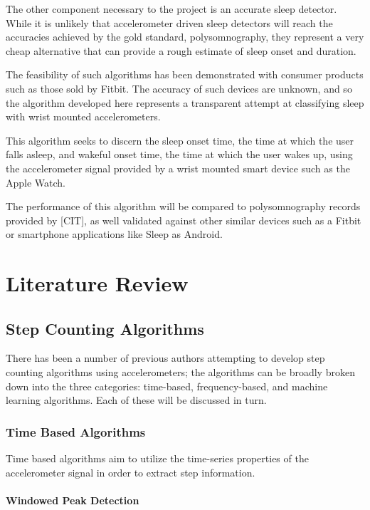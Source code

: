             The other component necessary to the project is an accurate sleep detector. While it is unlikely that accelerometer driven sleep detectors will reach the accuracies achieved by the gold standard, polysomnography, they represent a very cheap alternative that can provide a rough estimate of sleep onset and duration.

            The feasibility of such algorithms has been demonstrated with consumer products such as those sold by Fitbit. The accuracy of such devices are unknown, and so the algorithm developed here represents a transparent attempt at classifying sleep with wrist mounted accelerometers.

            This algorithm seeks to discern the sleep onset time, the time at which the user falls asleep, and wakeful onset time, the time at which the user wakes up, using the accelerometer signal provided by a wrist mounted smart device such as the Apple Watch. 

            The performance of this algorithm will be compared to polysomnography records provided by [CIT], as well validated against other similar devices such as a Fitbit or smartphone applications like Sleep as Android.


    \chapter{Literature Review}

        \section{Step Counting Algorithms}

            There has been a number of previous authors attempting to develop step counting algorithms using accelerometers; the algorithms can be broadly broken down into the three categories: time-based, frequency-based, and machine learning algorithms. Each of these will be discussed in turn.

            \subsection{Time Based Algorithms}

                Time based algorithms aim to utilize the time-series properties of the accelerometer signal in order to extract step information.

                \subsubsection{Windowed Peak Detection}

